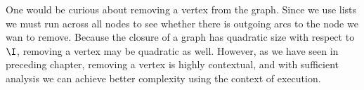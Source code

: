 One would be curious about removing a vertex from the graph. Since we use lists
we must run across all nodes to see whether there is outgoing arcs to the node
we wan to remove. Because the closure of a graph has quadratic size with
respect to $\I$, removing a vertex may be quadratic as well. However,
as we have seen in preceding chapter, removing a vertex is highly contextual,
and with sufficient analysis we can achieve better complexity using the 
context of execution.

















